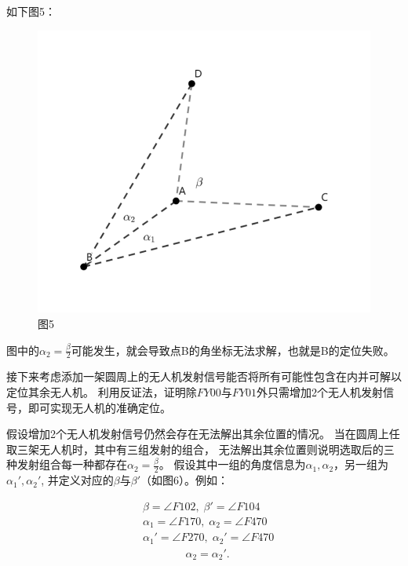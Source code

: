 \documentclass{ctexart}
\def\al{\alpha}
\def\b{\beta}
\begin{document}
	如下图5：

	\begin{figure}[htbp]
		\centering
		\includegraphics[scale=0.45]{pic/5.png}
		\caption*{图5}
	\end{figure}

	图中的$\al_2=\frac{\b}{2}$可能发生，就会导致点B的角坐标无法求解，也就是B的定位失败。

	\vspace{0.5em}
	接下来考虑添加一架圆周上的无人机发射信号能否将所有可能性包含在内并可解以定位其余无人机。
	利用反证法，证明除$FY00与FY01$外只需增加2个无人机发射信号，即可实现无人机的准确定位。
	\par
	假设增加2个无人机发射信号仍然会存在无法解出其余位置的情况。
	当在圆周上任取三架无人机时，其中有三组发射的组合，
	无法解出其余位置则说明选取后的三种发射组合每一种都存在$\al_2=\frac{\b}{2}$。
	假设其中一组的角度信息为$\al_1,\al_2$，另一组为$\al_1',\al_2'$,
	并定义对应的$\b$与$\b'$（如图6）。例如：

	\begin{align*}
		&\b = \angle F102 ,\;\b' = \angle F104\\
		&\al_1=\angle F170 ,\;\al_2=\angle F470\\
		&\al_1'=\angle F270, \; \al_2'=\angle F470\\
		&\;\;\;\;\;\;\;\;\;\;\;\;\;\;\al_2=\al_2'.
	\end{align*}
\end{document}
